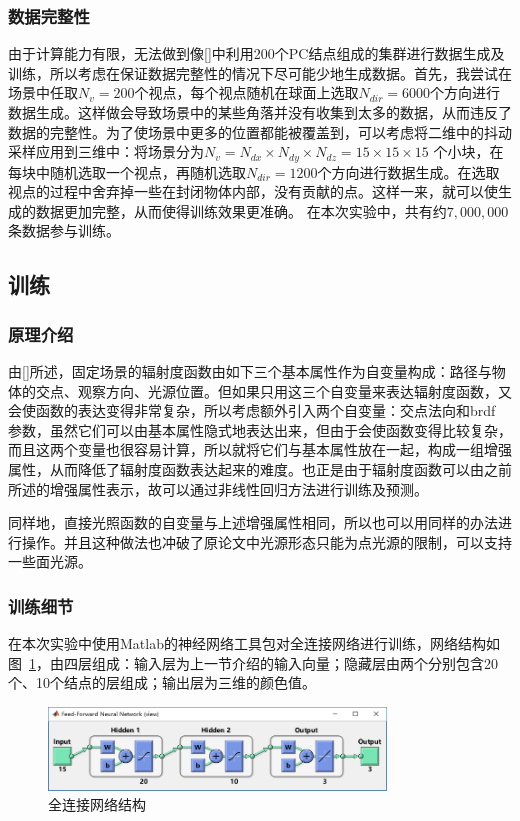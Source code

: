 \subsubsection {数据完整性}
由于计算能力有限，无法做到像[\cite{ren2013global}]中利用200个PC结点组成的集群进行数据生成及训练，所以考虑在保证数据完整性的情况下尽可能少地生成数据。首先，我尝试在场景中任取$N_{v}=200$个视点，每个视点随机在球面上选取$N_{dir}=6000$个方向进行数据生成。这样做会导致场景中的某些角落并没有收集到太多的数据，从而违反了数据的完整性。为了使场景中更多的位置都能被覆盖到，可以考虑将二维中的抖动采样应用到三维中：将场景分为$N_{v}=N_{dx}\times N_{dy}\times N_{dz}=15\times 15\times 15$ 个小块，在每块中随机选取一个视点，再随机选取$N_{dir}=1200$个方向进行数据生成。在选取视点的过程中舍弃掉一些在封闭物体内部，没有贡献的点。这样一来，就可以使生成的数据更加完整，从而使得训练效果更准确。 在本次实验中，共有约$7,000,000$条数据参与训练。

\subsection {训练}
\subsubsection {原理介绍}
由[\cite{ren2013global}]所述，固定场景的辐射度函数由如下三个基本属性作为自变量构成：路径与物体的交点、观察方向、光源位置。但如果只用这三个自变量来表达辐射度函数，又会使函数的表达变得非常复杂，所以考虑额外引入两个自变量：交点法向和brdf 参数，虽然它们可以由基本属性隐式地表达出来，但由于会使函数变得比较复杂，而且这两个变量也很容易计算，所以就将它们与基本属性放在一起，构成一组增强属性，从而降低了辐射度函数表达起来的难度。也正是由于辐射度函数可以由之前所述的增强属性表示，故可以通过非线性回归方法进行训练及预测。

同样地，直接光照函数的自变量与上述增强属性相同，所以也可以用同样的办法进行操作。并且这种做法也冲破了原论文中光源形态只能为点光源的限制，可以支持一些面光源。

\subsubsection {训练细节}
在本次实验中使用Matlab的神经网络工具包对全连接网络进行训练，网络结构如图~\ref{fig:neural_network}，由四层组成：输入层为上一节介绍的输入向量；隐藏层由两个分别包含20个、10个结点的层组成；输出层为三维的颜色值。
\begin{figure}[h]
    \centering
    \includegraphics[width=0.8\textwidth]{img/nn.png}
    \caption{全连接网络结构}
    \label{fig:neural_network}
\end{figure}

